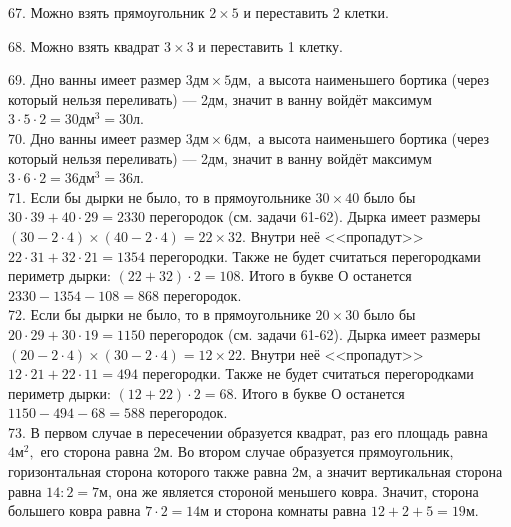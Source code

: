 67. Можно взять прямоугольник $2\times5$ и переставить 2 клетки.
\begin{center}
\begin{figure}[ht!]
\end{figure}
\end{center}
68. Можно взять квадрат $3\times3$ и переставить 1 клетку.
\begin{center}
\begin{figure}[ht!]
\end{figure}
\end{center}
69. Дно ванны имеет размер $3\text{дм}\times5\text{дм},$ а высота наименьшего бортика (через который нельзя переливать) --- 2дм, значит в ванну войдёт максимум $3\cdot5\cdot2=30\text{дм}^3=30$л.\\
70. Дно ванны имеет размер $3\text{дм}\times6\text{дм},$ а высота наименьшего бортика (через который нельзя переливать) --- 2дм, значит в ванну войдёт максимум $3\cdot6\cdot2=36\text{дм}^3=36$л.\\
71. Если бы дырки не было, то в прямоугольнике $30\times40$ было бы $30\cdot39+40\cdot29=2330$ перегородок (см. задачи 61-62). Дырка имеет размеры $(30-2\cdot4)\times(40-2\cdot4)=22\times32.$ Внутри неё <<пропадут>> $22\cdot31+32\cdot21=1354$ перегородки. Также не будет считаться перегородками периметр дырки: $(22+32)\cdot2=108.$ Итого в букве О останется $2330-1354-108=868$ перегородок.\\
72. Если бы дырки не было, то в прямоугольнике $20\times30$ было бы $20\cdot29+30\cdot19=1150$ перегородок (см. задачи 61-62). Дырка имеет размеры $(20-2\cdot4)\times(30-2\cdot4)=12\times22.$ Внутри неё <<пропадут>> $12\cdot21+22\cdot11=494$ перегородки. Также не будет считаться перегородками периметр дырки: $(12+22)\cdot2=68.$ Итого в букве О останется $1150-494-68=588$ перегородок.\\
73. В первом случае в пересечении образуется квадрат, раз его площадь равна $4\text{м}^2,$ его сторона равна 2м. Во втором случае образуется прямоугольник, горизонтальная сторона которого также равна 2м, а значит вертикальная сторона равна $14:2=7$м, она же является стороной меньшего ковра. Значит, сторона большего ковра равна $7\cdot2=14$м и сторона комнаты равна $12+2+5=19$м.
\begin{center}
\begin{figure}[ht!]
\end{figure}
\end{center}

